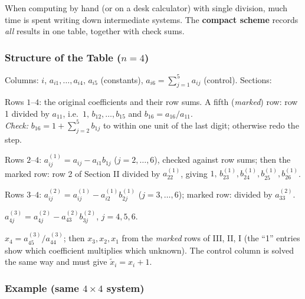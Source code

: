 \documentclass[hidelinks]{article}
\begin{document}
When computing by hand (or on a desk calculator) with single division, much time is spent writing down intermediate systems. The \textbf{compact scheme} records \emph{all} results in one table, together with check sums.

\subsubsection{Structure of the Table ($n=4$)}

Columns: $i$, $a_{i1},\dots,a_{i4}$, $a_{i5}$ (constants), $a_{i6}=\sum_{j=1}^5a_{ij}$ (control). Sections:
\begin{description}[leftmargin=1.5em]
    \item[Section I.] Rows $1$--$4$: the original coefficients and their row sums. A fifth (\emph{marked}) row: row 1 divided by $a_{11}$, i.e.\ $1,\,b_{12},\dots,b_{15}$ and $b_{16}=a_{16}/a_{11}$.\\
    \emph{Check:} $b_{16}=1+\sum_{j=2}^5b_{1j}$ to within one unit of the last digit; otherwise redo the step.
    \item[Section II.] Rows $2$--$4$: $a^{(1)}_{ij}=a_{ij}-a_{i1}b_{1j}$ ($j=2,\dots,6$), checked against row sums; then the marked row: row 2 of Section II divided by $a^{(1)}_{22}$, giving $1,\,b^{(1)}_{23},b^{(1)}_{24},b^{(1)}_{25},b^{(1)}_{26}$.
    \item[Section III.] Rows $3$--$4$: $a^{(2)}_{ij}=a^{(1)}_{ij}-a^{(1)}_{i2}b^{(1)}_{2j}$ ($j=3,\dots,6$); marked row: divided by $a^{(2)}_{33}$.
    \item[Section IV.] $a^{(3)}_{4j}=a^{(2)}_{4j}-a^{(2)}_{43}b^{(2)}_{3j}$, $j=4,5,6$.
    \item[Section V (reverse).] $x_4=a^{(3)}_{45}/a^{(3)}_{44}$; then $x_3,x_2,x_1$ from the \emph{marked} rows of III, II, I (the ``1'' entries show which coefficient multiplies which unknown). The control column is solved the same way and must give $\tilde x_i=x_i+1$.
\end{description}

\subsubsection{Example (same $4\times4$ system)}
\end{document}
